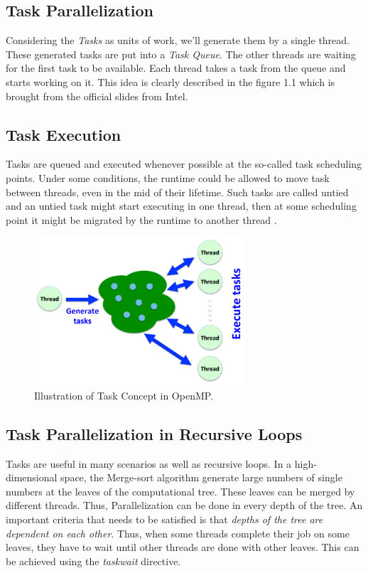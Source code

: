 \documentclass[12pt]{article}
\numberwithin{equation}{section}
\numberwithin{table}{section}
\numberwithin{figure}{section}
\begin{document}
\subsection{Task Parallelization}
Considering the \textit{Tasks} as units of work, we'll generate them by a single thread. These generated tasks are put into a \textit{Task Queue}. The other threads are waiting for the first task to be available. Each thread takes a task from the queue and starts working on it. This idea is clearly described in the figure 1.1 which is brought from the official slides from Intel.
\subsection{Task Execution}
Tasks are queued and executed whenever possible at the so-called task scheduling points. Under some conditions, the runtime could be allowed to move task between threads, even in the mid of their lifetime. Such tasks are called untied and an untied task might start executing in one thread, then at some scheduling point it might be migrated by the runtime to another thread {}.

\begin{figure}[!h]\centering
	\includegraphics[width=0.7\textwidth]{task_concept.png}
	\caption{Illustration of Task Concept in OpenMP.}
	\label{figsolplot}
\end{figure}

\subsection{Task Parallelization in Recursive Loops}
Tasks are useful in many scenarios as well as recursive loops. In a high-dimensional space, the Merge-sort algorithm generate large numbers of single numbers at the leaves of the computational tree. These leaves can be merged by different threads. Thus, Parallelization can be done in every depth of the tree. An important criteria that needs to be satisfied is that \textit{depths of the tree are dependent on each other}. Thus, when some threads complete their job on some leaves, they have to wait until other threads are done with other leaves. This can be achieved using the \textit{taskwait} directive.
\end{document}
